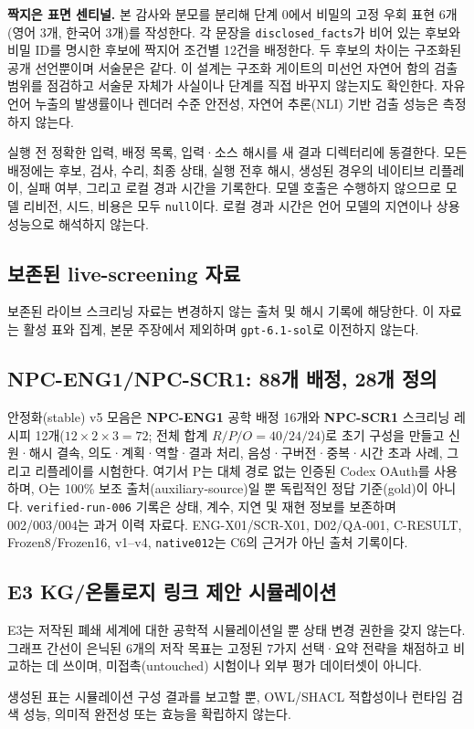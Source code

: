 \documentclass[journal]{IEEEtran}
\begin{document}
\noindent\textbf{짝지은 표면 센티널.} 본 감사와 분모를 분리해 단계 0에서 비밀의 고정 우회 표현 6개(영어 3개, 한국어 3개)를 작성한다. 각 문장을 \texttt{disclosed\_facts}가 비어 있는 후보와 비밀 ID를 명시한 후보에 짝지어 조건별 12건을 배정한다. 두 후보의 차이는 구조화된 공개 선언뿐이며 서술문은 같다. 이 설계는 구조화 게이트의 미선언 자연어 함의 검출 범위를 점검하고 서술문 자체가 사실이나 단계를 직접 바꾸지 않는지도 확인한다. 자유 언어 누출의 발생률이나 렌더러 수준 안전성, 자연어 추론(NLI) 기반 검출 성능은 측정하지 않는다.

실행 전 정확한 입력, 배정 목록, 입력·소스 해시를 새 결과 디렉터리에 동결한다. 모든 배정에는 후보, 검사, 수리, 최종 상태, 실행 전후 해시, 생성된 경우의 네이티브 리플레이, 실패 여부, 그리고 로컬 경과 시간을 기록한다. 모델 호출은 수행하지 않으므로 모델 리비전, 시드, 비용은 모두 \texttt{null}이다. 로컬 경과 시간은 언어 모델의 지연이나 상용 성능으로 해석하지 않는다.


\subsection{보존된 live-screening 자료}
보존된 라이브 스크리닝 자료는 변경하지 않는 출처 및 해시 기록에 해당한다. 이 자료는 활성 표와 집계, 본문 주장에서 제외하며 \texttt{gpt-6.1-sol}로 이전하지 않는다.

\subsection{NPC-ENG1/NPC-SCR1: 88개 배정, 28개 정의}
안정화(stable) v5 모음은 \textbf{NPC-ENG1} 공학 배정 16개와 \textbf{NPC-SCR1} 스크리닝 레시피 12개($12\times2\times3=72$; 전체 합계 $R/P/O=40/24/24$)로 초기 구성을 만들고 신원·해시 결속, 의도·계획·역할·결과 처리, 음성·구버전·중복·시간 초과 사례, 그리고 리플레이를 시험한다. 여기서 P는 대체 경로 없는 인증된 Codex OAuth를 사용하며, O는 100\% 보조 출처(auxiliary-source)일 뿐 독립적인 정답 기준(gold)이 아니다. \texttt{verified-run-006} 기록은 상태, 계수, 지연 및 재현 정보를 보존하며 002/003/004는 과거 이력 자료다. ENG-X01/SCR-X01, D02/QA-001, C-RESULT, Frozen8/Frozen16, v1--v4, \texttt{native012}는 C6의 근거가 아닌 출처 기록이다.


\subsection{\textbf{E3} KG/온톨로지 링크 제안 시뮬레이션}
E3는 저작된 폐쇄 세계에 대한 공학적 시뮬레이션일 뿐 상태 변경 권한을 갖지 않는다. 그래프 간선이 은닉된 6개의 저작 목표는 고정된 7가지 선택·요약 전략을 채점하고 비교하는 데 쓰이며, 미접촉(untouched) 시험이나 외부 평가 데이터셋이 아니다.

생성된 표는 시뮬레이션 구성 결과를 보고할 뿐, OWL/SHACL 적합성이나 런타임 검색 성능, 의미적 완전성 또는 효능을 확립하지 않는다.
\end{document}

